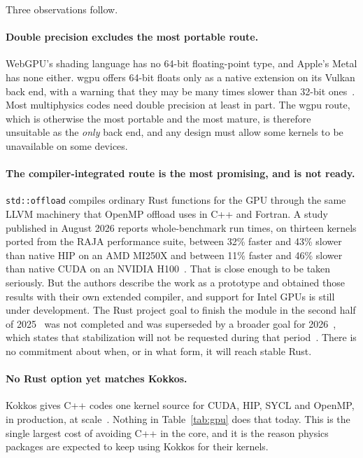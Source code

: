 \documentclass[11pt,a4paper]{article}
\newcommand{\code}[1]{\texttt{#1}}
\begin{document}
Three observations follow.

\paragraph{Double precision excludes the most portable route.}  WebGPU's
shading language has no 64-bit floating-point type, and Apple's Metal has
none either.  wgpu offers 64-bit floats only as a native extension on its
Vulkan back end, with a warning that they may be many times slower than
32-bit ones~\cite{wgpu}.  Most multiphysics codes need double precision at
least in part.
The wgpu route, which is otherwise the most portable and the most mature, is
therefore unsuitable as the \emph{only} back end, and any design must allow
some kernels to be unavailable on some devices.

\paragraph{The compiler-integrated route is the most promising, and is not
ready.}  \code{std::offload} compiles ordinary Rust functions for the GPU
through the same LLVM machinery that OpenMP offload uses in C++ and Fortran.
A study published in August 2026 reports whole-benchmark run times, on
thirteen kernels ported from the RAJA performance suite, between 32\% faster
and 43\% slower than native HIP on an AMD MI250X and between 11\% faster and
46\% slower than native CUDA on an NVIDIA H100~\cite{rustoffload}.  That is
close enough to be taken seriously.  But the authors describe the work as a
prototype and obtained those results with their own extended compiler, and
support for Intel GPUs is still under development.  The Rust project goal to
finish the module in the second half of 2025~\cite{offloadgoal} was not
completed and was superseded by a broader goal for
2026~\cite{rustgoals2026}, which states that stabilization will not be
requested during that period~\cite{mlgoal2026}.  There is no commitment
about when, or in what form, it will reach stable Rust.

\paragraph{No Rust option yet matches Kokkos.}  Kokkos gives C++ codes one
kernel source for CUDA, HIP, SYCL and OpenMP, in production, at
scale~\cite{kokkos3}.  Nothing in Table~\ref{tab:gpu} does that today.  This
is the single largest cost of avoiding C++ in the core, and it is the reason
physics packages are expected to keep using Kokkos for their kernels.
\end{document}
